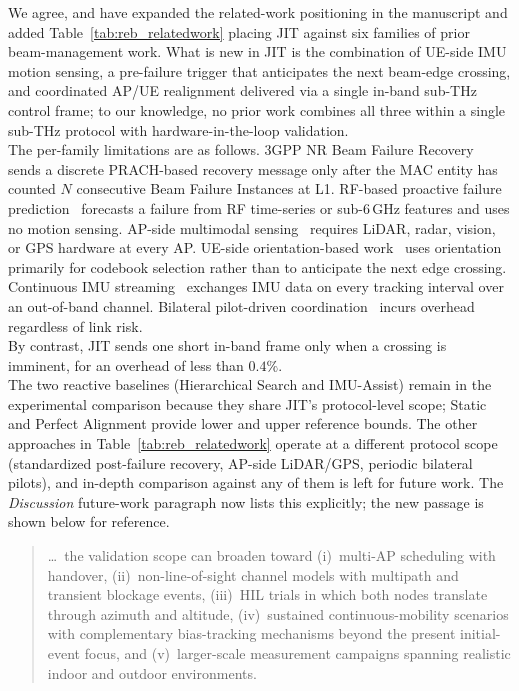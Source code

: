 \documentclass{article}
\begin{document}
\noindent We agree, and have expanded the related-work positioning in the manuscript and added Table~\ref{tab:reb_relatedwork} placing JIT against six families of prior beam-management work. What is new in JIT is the combination of UE-side IMU motion sensing, a pre-failure trigger that anticipates the next beam-edge crossing, and coordinated AP/UE realignment delivered via a single in-band sub-THz control frame; to our knowledge, no prior work combines all three within a single sub-THz protocol with hardware-in-the-loop validation.\\

\noindent The per-family limitations are as follows. 3GPP NR Beam Failure Recovery~\cite{Giordani2018ATO, Heng2021SixChallenges} sends a discrete PRACH-based recovery message only after the MAC entity has counted $N$ consecutive Beam Failure Instances at L1. RF-based proactive failure prediction~\cite{9838772, Alrabeiah2020DeepLearning} forecasts a failure from RF time-series or sub-6\,GHz features and uses no motion sensing. AP-side multimodal sensing~\cite{Alkhateeb2023DeepSense, Jiang2023LiDAR, Morais2023Position} requires LiDAR, radar, vision, or GPS hardware at every AP. UE-side orientation-based work~\cite{Rezaie2022Orientation, Struye2023CoVRage} uses orientation primarily for codebook selection rather than to anticipate the next edge crossing. Continuous IMU streaming~\cite{Brambilla_2019} exchanges IMU data on every tracking interval over an out-of-band channel. Bilateral pilot-driven coordination~\cite{Alkhateeb2018DLCB, Xue2023Standardization} incurs overhead regardless of link risk.\\

\noindent By contrast, JIT sends one short in-band frame only when a crossing is imminent, for an overhead of less than $0.4\%$.\\

\noindent The two reactive baselines (Hierarchical Search and IMU-Assist) remain in the experimental comparison because they share JIT's protocol-level scope; Static and Perfect Alignment provide lower and upper reference bounds. The other approaches in Table~\ref{tab:reb_relatedwork} operate at a different protocol scope (standardized post-failure recovery, AP-side LiDAR/GPS, periodic bilateral pilots), and in-depth comparison against any of them is left for future work. The \emph{Discussion} future-work paragraph now lists this explicitly; the new passage is shown below for reference.

\begin{quote}
{\color{cyan!75!black}
\dots\ the validation scope can broaden toward (i)~multi-AP scheduling with handover, (ii)~non-line-of-sight channel models with multipath and transient blockage events, (iii)~HIL trials in which both nodes translate through azimuth and altitude, (iv)~sustained continuous-mobility scenarios with complementary bias-tracking mechanisms beyond the present initial-event focus, and (v)~larger-scale measurement campaigns spanning realistic indoor and outdoor environments.
}
\end{quote}
\end{document}
